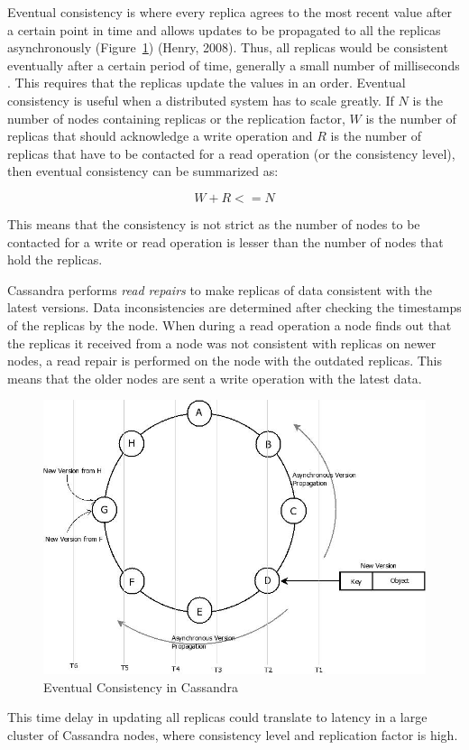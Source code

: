 \begin{description}
   Eventual consistency is where every replica agrees to the most recent value
   after a certain point in time and allows updates to be propagated to all the
   replicas asynchronously (Figure~\ref{f: eventual consistency}) (Henry, 2008). Thus, all replicas
   would be consistent eventually after a certain period of time, generally a small number of
   milliseconds .
   This requires that the replicas update the values in an order. Eventual
   consistency is useful when a distributed system has to scale greatly.
   If $N$ is the number of nodes containing replicas or the
  replication factor, $W$ is the number of replicas that should
  acknowledge a write operation and $R$ is the number of replicas
  that have to be contacted for a read operation (or the consistency level),
  then eventual consistency can be summarized as:%
  
  \begin{equation}
  	W + R <= N \nonumber  
  \end{equation}
  
  This means that the consistency is not strict as the number of nodes to be
  contacted for a write or read operation is lesser than the number of nodes
  that hold the replicas.
  
  Cassandra performs \textit{read repairs} to make replicas of data consistent
  with the latest versions. Data inconsistencies are determined after checking
  the timestamps of the replicas by the node.  When during a read operation a
  node finds out that the replicas it received from a node  was not consistent with
  replicas on newer nodes, a read repair is performed on the node with the
  outdated replicas. This means that the older
  nodes are sent a write operation with the latest data. 
  
  \begin{figure}[H]
\centering
\includegraphics[width=.7\textwidth]{./figure/Solutions/Eventual-consistency-Cassandra.png}
	\caption{Eventual Consistency in Cassandra}\label{f: eventual consistency}
\end{figure}
   This time delay in updating all replicas could translate to latency in a
   large cluster of
  Cassandra nodes, where consistency level and replication factor is high. 
  

\end{description}
